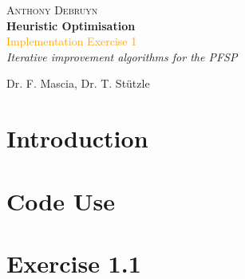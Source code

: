\newcommand*{\titleTH}{\begingroup %
\raggedleft %
\vspace*{\baselineskip} %

{\Large \textsc{Anthony Debruyn}}\\[0.167\textheight] %

{\LARGE\bfseries Heuristic Optimisation}\\[\baselineskip] %

{\textcolor{Orange}{\Huge Implementation Exercise 1}}\\[\baselineskip] %

{\Large \textit{Iterative improvement algorithms for the PFSP}}\par %

\vfill %


{\large Dr. F. Mascia, Dr. T. Stützle \course}\par %

\endgroup}


 

\thispagestyle{empty}

\titleTH %

\newpage

\section{Introduction}

\section{Code Use}

\section{Exercise 1.1}

